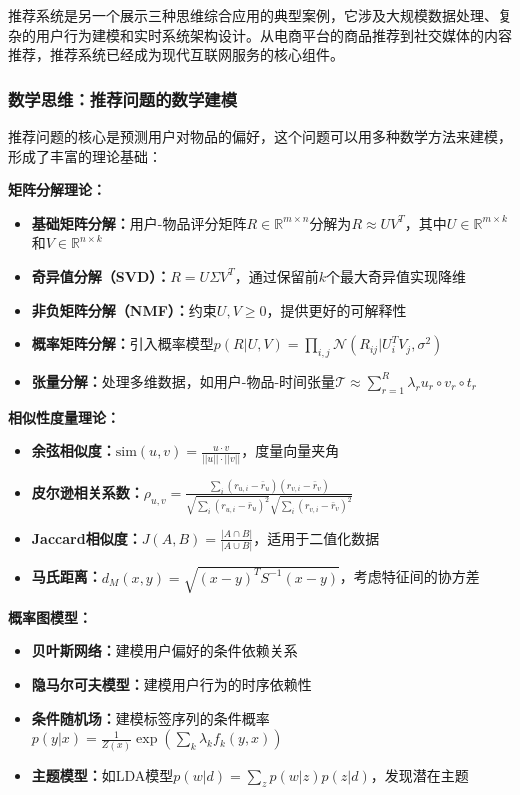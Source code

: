 推荐系统是另一个展示三种思维综合应用的典型案例，它涉及大规模数据处理、复杂的用户行为建模和实时系统架构设计。从电商平台的商品推荐到社交媒体的内容推荐，推荐系统已经成为现代互联网服务的核心组件。

\subsubsection{数学思维：推荐问题的数学建模}

推荐问题的核心是预测用户对物品的偏好，这个问题可以用多种数学方法来建模，形成了丰富的理论基础：

\textbf{矩阵分解理论：}
\begin{itemize}
\item \textbf{基础矩阵分解：}用户-物品评分矩阵$R \in \mathbb{R}^{m \times n}$分解为$R \approx UV^T$，其中$U \in \mathbb{R}^{m \times k}$和$V \in \mathbb{R}^{n \times k}$
\item \textbf{奇异值分解（SVD）：}$R = U\Sigma V^T$，通过保留前$k$个最大奇异值实现降维
\item \textbf{非负矩阵分解（NMF）：}约束$U, V \geq 0$，提供更好的可解释性
\item \textbf{概率矩阵分解：}引入概率模型$p(R|U,V) = \prod_{i,j} \mathcal{N}(R_{ij}|U_i^T V_j, \sigma^2)$
\item \textbf{张量分解：}处理多维数据，如用户-物品-时间张量$\mathcal{T} \approx \sum_{r=1}^R \lambda_r u_r \circ v_r \circ t_r$
\end{itemize}

\textbf{相似性度量理论：}
\begin{itemize}
\item \textbf{余弦相似度：}$\text{sim}(u,v) = \frac{u \cdot v}{||u|| \cdot ||v||}$，度量向量夹角
\item \textbf{皮尔逊相关系数：}$\rho_{u,v} = \frac{\sum_i (r_{u,i} - \bar{r}_u)(r_{v,i} - \bar{r}_v)}{\sqrt{\sum_i (r_{u,i} - \bar{r}_u)^2} \sqrt{\sum_i (r_{v,i} - \bar{r}_v)^2}}$
\item \textbf{Jaccard相似度：}$J(A,B) = \frac{|A \cap B|}{|A \cup B|}$，适用于二值化数据
\item \textbf{马氏距离：}$d_M(x,y) = \sqrt{(x-y)^T S^{-1} (x-y)}$，考虑特征间的协方差
\end{itemize}

\textbf{概率图模型：}
\begin{itemize}
\item \textbf{贝叶斯网络：}建模用户偏好的条件依赖关系
\item \textbf{隐马尔可夫模型：}建模用户行为的时序依赖性
\item \textbf{条件随机场：}建模标签序列的条件概率$p(y|x) = \frac{1}{Z(x)} \exp(\sum_k \lambda_k f_k(y,x))$
\item \textbf{主题模型：}如LDA模型$p(w|d) = \sum_z p(w|z)p(z|d)$，发现潜在主题
\end{itemize}

